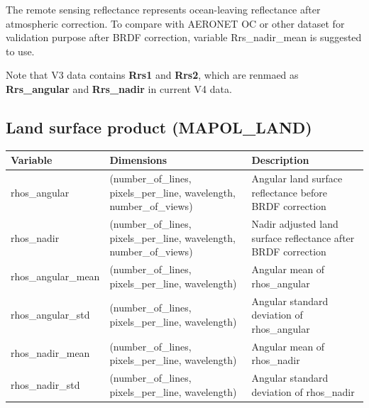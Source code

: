 \documentclass[
  letterpaper,
  open=any]{scrbook}
\begin{document}
The remote sensing reflectance represents ocean-leaving reflectance
after atmospheric correction. To compare with AERONET OC or other
dataset for validation purpose after BRDF correction, variable
Rrs\_nadir\_mean is suggested to use.

Note that V3 data contains \textbf{Rrs1} and \textbf{Rrs2}, which are
renmaed as \textbf{Rrs\_angular} and \textbf{Rrs\_nadir} in current V4
data.

\subsection{Land surface product
(MAPOL\_LAND)}\label{land-surface-product-mapol_land}

\begin{longtable}[]{@{}
  >{\raggedright\arraybackslash}p{}
  >{\raggedright\arraybackslash}p{}
  >{\raggedright\arraybackslash}p{}@{}}
\toprule\noalign{}
\begin{minipage}[b]{\linewidth}\raggedright
Variable
\end{minipage} & \begin{minipage}[b]{\linewidth}\raggedright
Dimensions
\end{minipage} & \begin{minipage}[b]{\linewidth}\raggedright
Description
\end{minipage} \\
\midrule\noalign{}
\endhead
\bottomrule\noalign{}
\endlastfoot
rhos\_angular & (number\_of\_lines, pixels\_per\_line, wavelength,
number\_of\_views) & Angular land surface reflectance before BRDF
correction \\
rhos\_nadir & (number\_of\_lines, pixels\_per\_line, wavelength,
number\_of\_views) & Nadir adjusted land surface reflectance after BRDF
correction \\
rhos\_angular\_mean & (number\_of\_lines, pixels\_per\_line, wavelength)
& Angular mean of rhos\_angular \\
rhos\_angular\_std & (number\_of\_lines, pixels\_per\_line, wavelength)
& Angular standard deviation of rhos\_angular \\
rhos\_nadir\_mean & (number\_of\_lines, pixels\_per\_line, wavelength) &
Angular mean of rhos\_nadir \\
rhos\_nadir\_std & (number\_of\_lines, pixels\_per\_line, wavelength) &
Angular standard deviation of rhos\_nadir \\
\end{longtable}
\end{document}

